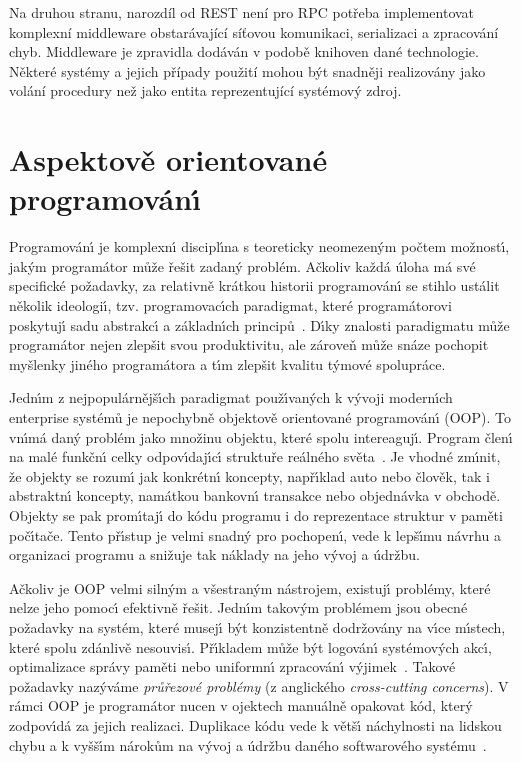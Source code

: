 Na druhou stranu, narozdíl od \gls{REST} není pro \gls{RPC} potřeba
implementovat komplexní middleware obstarávající síťovou komunikaci,
serializaci a zpracování chyb. Middleware je zpravidla dodáván v podobě knihoven
dané technologie. Některé systémy a jejich případy použití mohou být snadněji
realizovány jako volání procedury než jako entita reprezentující systémový zdroj.

\section{Aspektově orientované programován\'{\i}}

Programován\'{\i} je komplexn\'{\i} discipl\'{\i}na s teoreticky
neomezen\'ym počtem možnost\'{\i}, jak\'ym programátor může
řešit zadan\'y problém. Ačkoliv každá úloha má své specifické
požadavky, za relativně krátkou historii programován\'{\i} se
stihlo ustálit několik ideologi\'{\i}, tzv. programovac\'{\i}ch
paradigmat, které programátorovi poskytuj\'{\i} sadu abstrakc\'{\i}
a základn\'{\i}ch principů~\cite{van2009programming}.
D\'{\i}ky znalosti paradigmatu může programátor nejen zlepšit
svou produktivitu, ale zároveň může snáze pochopit myšlenky
jiného programátora a t\'{\i}m zlepšit kvalitu t\'ymové spolupráce.

Jedn\'{\i}m z nejpopulárnějš\'{\i}ch paradigmat použ\'{\i}van\'ych k
v\'yvoji modern\'{\i}ch enterprise systémů je nepochybně
objektově orientované programován\'{\i} (\gls{OOP}). To vn\'{\i}má dan\'y problém
jako množinu objektu, které spolu intereaguj\'{\i}. Program
člen\'{\i} na malé funkčn\'{\i} celky odpov\'{\i}daj\'{\i}c\'{\i} struktuře
reálného světa~\cite{rentsch1982object}. Je vhodné zm\'{\i}nit,
že objekty se rozum\'{\i} jak konkrétn\'{\i} koncepty, např\'{\i}klad
auto nebo člověk, tak i abstraktn\'{\i} koncepty,
namátkou bankovn\'{\i} transakce nebo objednávka v obchodě.
Objekty se pak prom\'{\i}taj\'{\i} do kódu programu i do
reprezentace struktur v paměti poč\'{\i}tače.
Tento př\'{\i}stup je velmi snadn\'y pro pochopen\'{\i},
vede k lepš\'{\i}mu návrhu a organizaci programu a snižuje
tak náklady na jeho v\'yvoj a údržbu.

Ačkoliv je \gls{OOP} velmi siln\'ym a všestran\'ym nástrojem,
existuj\'{\i} problémy, které nelze jeho pomoc\'{\i} efektivně řešit.
Jedn\'{\i}m takov\'ym problémem jsou obecné požadavky na systém,
které musej\'{\i} b\'yt konzistentně dodržovány na v\'{\i}ce m\'{\i}stech,
které spolu zdánlivě nesouvis\'{\i}. Př\'{\i}kladem
může b\'yt logován\'{\i} systémov\'ych akc\'{\i}, optimalizace správy paměti
nebo uniformn\'{\i} zpracován\'{\i} v\'yjimek~\cite{kiczales1997aspect}.
Takové požadavky naz\'yváme \textit{průřezové problémy}
(z anglického \textit{cross-cutting concerns}).
V rámci \gls{OOP} je programátor nucen v ojektech manuálně opakovat
kód, kter\'y zodpov\'{\i}dá za jejich realizaci. Duplikace kódu
vede k větš\'{\i} náchylnosti na lidskou chybu a k vyšš\'{\i}m nárokům na v\'yvoj
a údržbu daného softwarového systému~\cite{fowler1999refactoring}.

